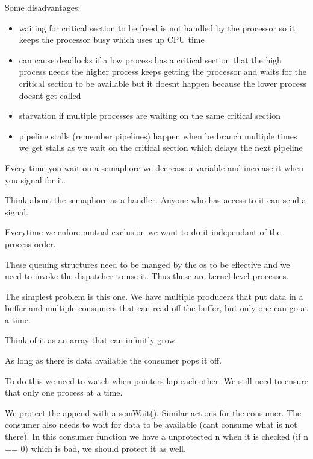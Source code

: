 \documentclass[24pt]{article}
\begin{document}
Some disadvantages:
\begin{itemize}
    \item waiting for critical section to be freed is not handled by the processor so it keeps the processor busy which uses up CPU time
    \item can cause deadlocks if a low process has a critical section that the high process needs the higher process keeps getting the processor and waits for the critical section to be available but it doesnt happen because the lower process doesnt get called
    \item starvation if multiple processes are waiting on the same critical section
    \item pipeline stalls (remember pipelines) happen when be branch multiple times we get stalls as we wait on the critical section which delays the next pipeline
\end{itemize}



Every time you wait on a semaphore we decrease a variable and increase it when you signal for it.

Think about the semaphore as a handler. Anyone who has access to it can send a signal.

Everytime we enfore mutual exclusion we want to do it independant of the process order.

These queuing structures need to be manged by the os to be effective and we need to invoke the dispatcher to use it. Thus these are kernel level processes.






The simplest problem is this one. We have multiple producers that put data in a buffer and multiple consumers that can read off the buffer, but only one can go at a time.

Think of it as an array that can infinitly grow.

As long as there is data available the consumer pops it off.


To do this we need to watch when pointers lap each other. We still need to ensure that only one process at a time.



We protect the append with a semWait(). Similar actions for the consumer. The consumer also needs to wait for data to be available (cant consume what is not there). In this consumer function we have a unprotected n when it is checked (if n == 0) which is bad, we should protect it as well.
\end{document}
